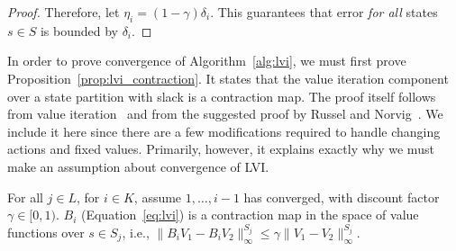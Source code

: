 \begin{proof}
Therefore, let $\eta_i = (1 - \gamma) \delta_i$. This guarantees that error \emph{for all} states $s \in S$ is bounded by $\delta_i$.
\end{proof}

In order to prove convergence of Algorithm~\ref{alg:lvi}, we must first prove Proposition~\ref{prop:lvi_contraction}. It states that the value iteration component over a state partition with slack is a contraction map. The proof itself follows from value iteration~\cite{Bellman57} and from the suggested proof by Russel and Norvig~. We include it here since there are a few modifications required to handle changing actions and fixed values. Primarily, however, it explains exactly why we must make an assumption about convergence of LVI.


\begin{proposition}
    \label{prop:lvi_contraction}
    For all $j \in L$, for $i \in K$, assume $1, \ldots, i - 1$ has converged, with discount factor $\gamma \in [0, 1)$. $B_i$ (Equation~\ref{eq:lvi}) is a contraction map in the space of value functions over $s \in S_j$, i.e., $\| B_i V_1 - B_i V_2 \|_\infty^{S_j} \leq \gamma \| V_1 - V_2 \|_\infty^{S_j}$.
\end{proposition}

